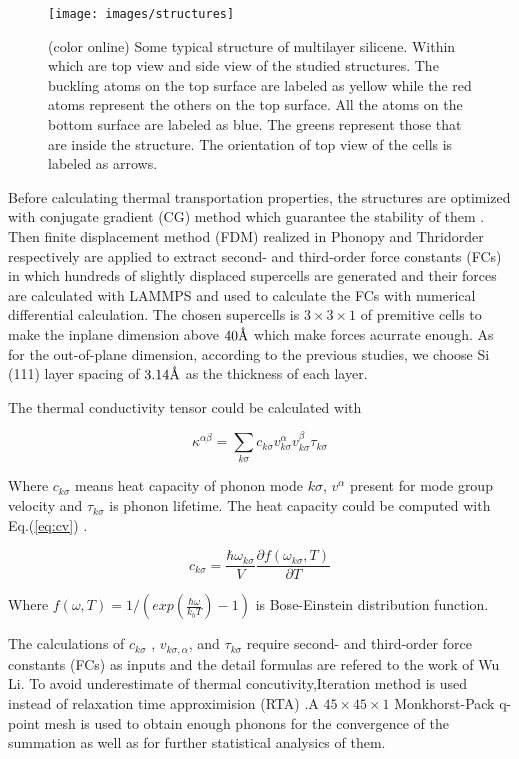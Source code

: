 \documentclass[%
 reprint,
 amsmath,amssymb,
 aps,
 prb,
]{revtex4-1}
\newcommand{\angstrom}{\mbox{\normalfont\AA}}
\begin{document}
\begin{figure}[b]
  \texttt{[image: images/structures]}
  \caption{\label{fig:structures}  (color online) Some typical structure of multilayer silicene. Within which  are top view and side view of the studied structures. The buckling atoms on the top surface are labeled as yellow while the red atoms represent the others on the top surface. All the atoms on the bottom surface are labeled as blue. The greens represent those that are inside the structure. The orientation of top view of the cells is labeled as arrows.}
\end{figure}

Before calculating thermal transportation properties, the  structures are  optimized with  conjugate gradient (CG) method which guarantee the stability of them .  Then finite displacement method (FDM) realized in Phonopy\cite{Togo2008} and Thridorder respectively are applied to extract second- and third-order force constants (FCs) in which hundreds of  slightly displaced supercells are generated and their forces are calculated with LAMMPS and used to calculate the FCs with  numerical differential calculation. The chosen supercells is $3 \times 3 \times 1$ of premitive cells to make the inplane dimension above  $40\angstrom$ which make  forces acurrate enough. As for the out-of-plane dimension, according to the previous studies, we choose Si (111) layer spacing of $3.14 \angstrom$ as the thickness of each layer.

The thermal conductivity tensor could be calculated with

\begin{equation}
  \kappa^{\alpha\beta} = \sum_{k \sigma}{c_{k \sigma}v^{\alpha}_{k \sigma}v^{\beta}_{k \sigma}\tau_{k \sigma}} \label{eq:kappasum}
\end{equation}

Where $c_{k \sigma}$ means heat capacity of phonon mode $k \sigma$, $v^{\alpha}$ present for mode group velocity and $\tau_{k \sigma}$ is phonon lifetime. The heat capacity  could be computed with Eq.(\ref{eq:cv}) .

\begin{equation}
  c_{k \sigma}=\frac{\hbar \omega_{k \sigma} }{V} \frac{\partial f(\omega_{k \sigma},T)}{\partial T} \label{eq:cv}
\end{equation}

Where $ f(\omega,T)=1/(exp(\frac{\hbar \omega}{k_b T})-1)$ is Bose-Einstein distribution function.

The calculations of $c_{k\sigma}$ , $v_{k\sigma,\alpha}$, and $\tau_{k\sigma}$ require second- and third-order force constants (FCs) as inputs and the detail formulas are refered to the work of  Wu Li\cite{Li2014}. To avoid underestimate of thermal concutivity,Iteration method is used instead of relaxation time approximision (RTA) .A $45\times 45 \times 1$ Monkhorst-Pack q-point mesh is used to obtain enough phonons for the convergence of the summation as well as for further statistical analysics of them.
\end{document}
